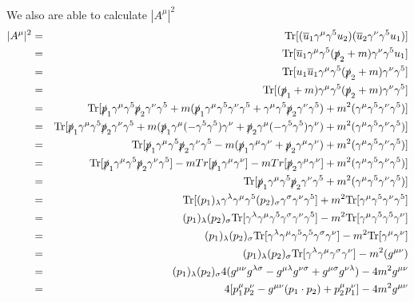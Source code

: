 \documentclass[12pt]{article}
\def \bea{\begin{eqnarray}}
\def \eea{\end{eqnarray}}
\def \Tr{{\rm Tr}}
\def \ou{\overline{u}}
\def \ga{\gamma}
\def \la{\lambda}
\def \si{\sigma}
\begin{document}
\begin{enumerate}
We also are able to calculate $|A^\mu|^2$
\bea
|A^{\mu}|^2 &=& \Tr[(\ou_1\ga^\mu \ga^5 u_2)(\ou_2 \ga^\nu \ga^5 u_1)] \\
&=& \Tr[\ou_1\ga^\mu \ga^5 (\slashed{p}_2+m) \ga^\nu \ga^5 u_1]  \\
&=&\Tr[u_1\ou_1\ga^\mu \ga^5 (\slashed{p}_2+m) \ga^\nu \ga^5 ]\\
&=&\Tr[(\slashed{p}_1+m)\ga^\mu \ga^5 (\slashed{p}_2+m) \ga^\nu \ga^5 ]\\
&=& \Tr[\slashed{p}_1\ga^\mu\ga^5 \slashed{p}_2\ga^\nu \ga^5 + m( \slashed{p}_1\ga^\mu\ga^5\ga^\nu \ga^5 +\ga^\mu\ga^5 \slashed{p}_2\ga^\nu \ga^5) + m^2(\ga^\mu\ga^5\ga^\nu \ga^5)] \\
&=&\Tr[\slashed{p}_1\ga^\mu\ga^5 \slashed{p}_2\ga^\nu \ga^5 + m( \slashed{p}_1\ga^\mu(-\ga^5 \ga^5)\ga^\nu +\slashed{p}_2\ga^\mu(-\ga^5\ga^5) \ga^\nu ) + m^2(\ga^\mu\ga^5\ga^\nu \ga^5)] \\
&=&\Tr[\slashed{p}_1\ga^\mu\ga^5 \slashed{p}_2\ga^\nu \ga^5 - m( \slashed{p}_1\ga^\mu\ga^\nu +\slashed{p}_2\ga^\mu\ga^\nu ) + m^2(\ga^\mu\ga^5\ga^\nu \ga^5)] \\
&=&\Tr[\slashed{p}_1\ga^\mu\ga^5 \slashed{p}_2\ga^\nu \ga^5] -mTr[ \slashed{p}_1\ga^\mu\ga^\nu]-mTr[ \slashed{p}_2\ga^\mu\ga^\nu]+ m^2(\ga^\mu\ga^5\ga^\nu \ga^5)] \\
&=&\Tr[\slashed{p}_1\ga^\mu\ga^5 \slashed{p}_2\ga^\nu \ga^5 + m^2(\ga^\mu\ga^5\ga^\nu \ga^5)] \\
&=& \Tr[(p_1)_\la\ga^\la\ga^\mu\ga^5 (p_2)_\si\ga^\si\ga^\nu \ga^5] + m^2\Tr[\ga^\mu\ga^5\ga^\nu \ga^5]\\
&=& (p_1)_\la(p_2)_\si \Tr[\ga^\la\ga^\mu\ga^5 \ga^\si\ga^\nu \ga^5] - m^2\Tr[\ga^\mu\ga^5\ga^5 \ga^\nu]\\
&=& (p_1)_\la(p_2)_\si \Tr[\ga^\la\ga^\mu\ga^5\ga^5 \ga^\si\ga^\nu] - m^2\Tr[\ga^\mu\ga^\nu]\\
&=& (p_1)_\la(p_2)_\si \Tr[\ga^\la\ga^\mu\ga^\si\ga^\nu] - m^2(g^{\mu\nu})\\
&=& (p_1)_\la(p_2)_\si 4(g^{\mu\nu}g^{\la\si} - g^{\mu\la} g^{\nu\si} + g^{\mu\si}g^{\nu\la}) - 4m^2g^{\mu\nu}\\
&=& 4[p_1^\mu p_2^\nu - g^{\mu\nu}(p_1 \cdot p_2) + p_2^\mu p_1^\nu] - 4m^2g^{\mu\nu} 
\eea


\end{enumerate}
\end{document}
